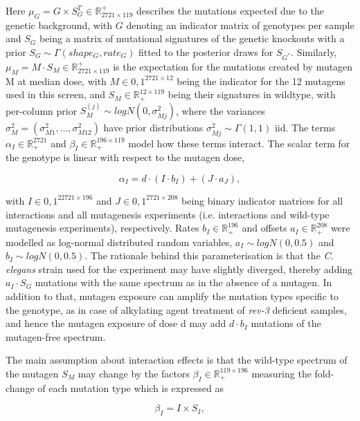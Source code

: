 Here $\mu_{G} = G \times S_{G}^{T} \in \mathbb{R}_{2721\times119}^{+}$ describes 
the mutations expected due to the genetic background, with $G$ denoting an 
indicator matrix of genotypes per sample and $S_{G}$ being a matrix of 
mutational signatures of the genetic knockouts with a prior $S_{G} \sim \Gamma(shape_{G}, rate_{G})$ 
fitted to the posterior draws for $S_{G^{*}}$. 
Similarly, $\mu_{M} = M \cdot S_{M} \in \mathbb{R}^{+}_{2721 \times 119}$
is the expectation for the mutations created by mutagen M at median dose, 
with $M \in {0,1}^{2721 \times 12}$ being the indicator for the 12 mutagens 
used in this screen, and $S_{M} \in \mathbb{R}_{+}^{12\times119}$ being their 
signatures in wildtype, with per-column prior $S_{M}^{(j)} \sim logN\left(0, \sigma_{Mj}^2\right)$, where the variances $\sigma_{M}^2 = \left(\sigma_{M1}^2, ..., \sigma_{M12}^2\right)$ have prior distributions $\sigma_{Mj}^2 \sim \Gamma(1,1)$ iid. 
The terms $\alpha_{I} \in \mathbb{R}_{+}^{2721}$ and $\beta_{I} \in \mathbb{ℝ}_{+}^{196 \times 119}$ model how these terms interact. The scalar 
term for the genotype is linear with respect to the mutagen dose,

\[\alpha_{I} = d \cdot (I \cdot b_{I}) + (J \cdot a_{J}),\]

with $I \in {0,1}^{22721 \times 196}$ and $J \in {0,1}^{2721 × 208}$ being binary 
indicator matrices for all interactions and all mutagenesis experiments 
(i.e. interactions and wild-type mutagenesis experiments), respectively. 
Rates $b_{I} \in \mathbb{R}_{+}^{196}$  and offsets $a_{I} \in \mathbb{R}_{+}^{208}$ 
were modelled as log-normal distributed random variables,
$a_{I} \sim logN(0,0.5)$ and $b_{I} \sim logN(0,0.5)$. 
The rationale behind this parameterisation is that the \textit{C. elegans} 
strain used for the experiment may have slightly diverged, 
thereby adding $a_{I} \cdot S_{G}$ mutations with the same spectrum 
as in the absence of a mutagen. In addition to that, mutagen 
exposure can amplify the mutation types specific to the genotype, 
as in case of alkylating agent treatment of \textit{rev-3} deficient samples, 
and hence the mutagen exposure of dose d may add $d \cdot b_{I}$ mutations 
of the mutagen-free spectrum.

The main assumption about interaction effects is that the wild-type spectrum 
of the mutagen $S_M$ may change by the factors $\beta_{I} \in \mathbb{ℝ}_{+}^{119 \times 196}$ measuring the fold-change of each mutation type which is expressed as 

\[\beta_{I} = I \times S_{I},\] 

